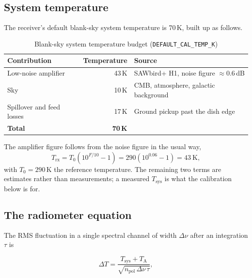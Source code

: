 \documentclass[11pt,a4paper]{article}
\begin{document}
\subsection{System temperature}

The receiver's default blank-sky system temperature is 70\,K, built up as follows.

\begin{table}[H]
\centering
\caption{Blank-sky system temperature budget (\texttt{DEFAULT\_CAL\_TEMP\_K})}
\label{tab:tsys}
\begin{tabular}{lrl}
\toprule
\textbf{Contribution} & \textbf{Temperature} & \textbf{Source} \\
\midrule
Low-noise amplifier & 43\,K & SAWbird+ H1, noise figure $\approx 0.6$\,dB \\
Sky & 10\,K & CMB, atmosphere, galactic background \\
Spillover and feed losses & 17\,K & Ground pickup past the dish edge \\
\midrule
\textbf{Total} & \textbf{70\,K} & \\
\bottomrule
\end{tabular}
\end{table}

The amplifier figure follows from the noise figure in the usual way,
\begin{equation}
T_\text{rx} = T_0\left(10^{F/10} - 1\right) = 290\left(10^{0.06} - 1\right) = 43\ \text{K},
\end{equation}
with $T_0 = 290$\,K the reference temperature. The remaining two terms are estimates rather than measurements; a measured $T_\text{sys}$ is what the calibration below is for.

\subsection{The radiometer equation}

The RMS fluctuation in a single spectral channel of width $\Delta\nu$ after an integration $\tau$ is

\begin{equation}
\Delta T = \frac{T_\text{sys} + T_\text{A}}{\sqrt{n_\text{pol}\,\Delta\nu\,\tau}},
\label{eq:radiometer}
\end{equation}
\end{document}
